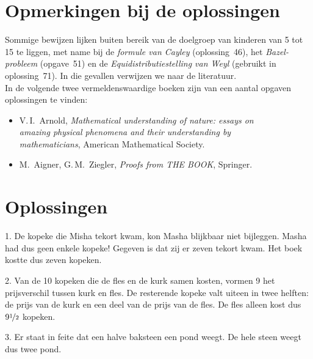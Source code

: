 \cleardoublepage

\section*{Opmerkingen bij de oplossingen}
Sommige bewijzen lijken buiten bereik van de doelgroep van kinderen van 5 tot 15 te liggen, met name bij de \textit{formule van Cayley} (oplos\-sing~46), het \textit{Bazel-probleem} (opgave~51) en de \textit{Equidistributiestelling van Weyl} (gebruikt in oplossing~71). In die gevallen verwijzen we naar de literatuur.\\

\noindent In de volgende twee vermeldenswaardige boeken zijn van een aantal opgaven oplossingen te vinden:
\begin{itemize}
    \item V.\,I.~Arnold, \textit{Mathematical understanding of nature: essays on\\amazing physical phenomena and their understanding by\\mathematicians}, American Mathematical Society.
    \item M.~Aigner, G.\,M.~Ziegler, \textit{Proofs from THE BOOK}, Springer.
\end{itemize}

\cleardoublepage

\section*{Oplossingen}

\begin{problem}{1.}
    De kopeke die Misha tekort kwam, kon Masha blijkbaar niet bijleggen. Masha had dus geen enkele kopeke! Gegeven is dat zij er zeven tekort kwam. Het boek kostte dus zeven kopeken.
\end{problem}

\begin{problem}{2.}
    Van de 10 kopeken die de fles en de kurk samen kosten, vormen 9 het prijsverschil tussen kurk en fles. De resterende kopeke valt uiteen in twee helften: de prijs van de kurk en een deel van de prijs van de fles. De fles alleen kost dus $9 \nicefrac{1}{2}$ kopeken.
\end{problem}

\begin{problem}{3.}
    Er staat in feite dat een halve baksteen een pond weegt. De hele steen weegt dus twee pond.
\end{problem}

